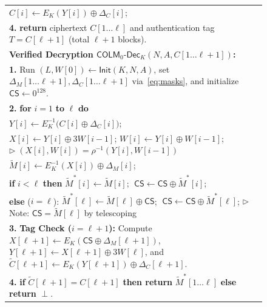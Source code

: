 \documentclass[11pt,a4paper]{article}
\theoremstyle{definition}
\theoremstyle{remark}
\newcommand{\CS}{\mathsf{CS}}
\begin{document}
\begin{figure}[t]
\begin{tabular}{@{}p{}@{}}
\hspace*{3.0em} $C[i] \leftarrow E_K(Y[i]) \oplus \Delta_C[i]$; \\
\hspace*{1.2em} \textbf{4.} \textbf{return} ciphertext $C[1 \dots \ell]$ and authentication tag $T = C[\ell + 1]$ (total $\ell + 1$ blocks). \\[4pt]
\midrule
\textbf{Verified Decryption $\mathsf{COLM}_0\text{-}\mathsf{Dec}_K(N, A, C[1 \dots \ell + 1])$:} \\
\hspace*{1.2em} \textbf{1.} Run $(L, W[0]) \leftarrow \mathsf{Init}(K, N, A)$, set $\Delta_M[1 \dots \ell+1], \Delta_C[1 \dots \ell+1]$ via~\eqref{eq:masks}, and initialize $\CS \leftarrow 0^{128}$. \\
\hspace*{1.2em} \textbf{2.} \textbf{for} $i = 1$ \textbf{to} $\ell$ \textbf{do} \\
\hspace*{3.0em} $Y[i] \leftarrow E_K^{-1}\big(C[i] \oplus \Delta_C[i]\big)$; \\
\hspace*{3.0em} $X[i] \leftarrow Y[i] \oplus 3W[i-1]$; \quad $W[i] \leftarrow Y[i] \oplus W[i-1]$; \hfill $\triangleright\; (X[i], W[i]) = \rho^{-1}(Y[i], W[i-1])$ \\
\hspace*{3.0em} $\tilde{M}[i] \leftarrow E_K^{-1}(X[i]) \oplus \Delta_M[i]$; \\
\hspace*{3.0em} \textbf{if} $i < \ell$ \textbf{then} $\tilde{M}^*[i] \leftarrow \tilde{M}[i]$; $\;\CS \leftarrow \CS \oplus \tilde{M}^*[i]$; \\
\hspace*{3.0em} \textbf{else} ($i = \ell$): $\tilde{M}^*[\ell] \leftarrow \tilde{M}[\ell] \oplus \CS$; $\;\CS \leftarrow \CS \oplus \tilde{M}^*[\ell]$; \hfill $\triangleright\;$ Note: $\CS = \tilde{M}[\ell]$ by telescoping \\
\hspace*{1.2em} \textbf{3.} \textbf{Tag Check ($i = \ell + 1$):} Compute $X[\ell+1] \leftarrow E_K(\CS \oplus \Delta_M[\ell+1])$, $Y[\ell+1] \leftarrow X[\ell+1] \oplus 3W[\ell]$, and $\tilde{C}[\ell+1] \leftarrow E_K(Y[\ell+1]) \oplus \Delta_C[\ell+1]$. \\
\hspace*{1.2em} \textbf{4.} \textbf{if} $\tilde{C}[\ell + 1] = C[\ell + 1]$ \textbf{then return} $\tilde{M}^*[1 \dots \ell]$ \textbf{else return} $\perp$. \\
\bottomrule
\end{tabular}
\end{figure}
\end{document}

